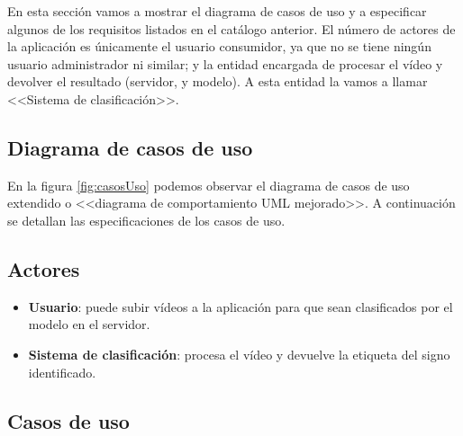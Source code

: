 En esta sección vamos a mostrar el diagrama de casos de uso y a especificar algunos de los requisitos listados en el catálogo anterior. El número de actores de la aplicación es únicamente el usuario consumidor, ya que no se tiene ningún usuario administrador ni similar; y la entidad encargada de procesar el vídeo y devolver el resultado (servidor,  y modelo). A esta entidad la vamos a llamar <<Sistema de clasificación>>.

\subsection{Diagrama de casos de uso}

En la figura \ref{fig:casosUso} podemos observar el diagrama de casos de uso extendido o <<diagrama de comportamiento UML mejorado>>. A continuación se detallan las especificaciones de los casos de uso.


\subsection{Actores}

\begin{itemize}
  \item \textbf{Usuario}: puede subir vídeos a la aplicación para que sean clasificados por el modelo en el servidor.

  \item \textbf{Sistema de clasificación}: procesa el vídeo y devuelve la etiqueta del signo identificado.
\end{itemize}

\subsection{Casos de uso}

